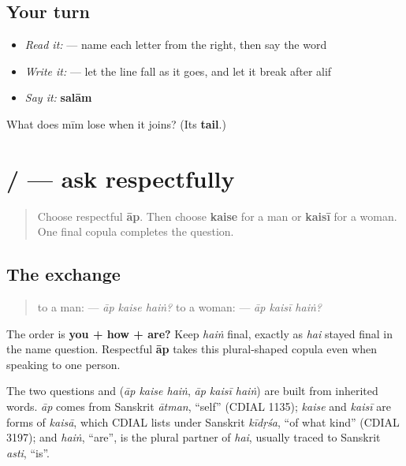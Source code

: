 \subsection*{Your turn}
\begin{itemize}
\raggedright
  \item \emph{Read it:}  — name each letter from the right, then say the word
  \item \emph{Write it:}  — let the line fall as it goes, and let it break after alif
  \item \emph{Say it:} \textbf{salām}
\end{itemize}

\begin{tcolorbox}[breakable,colback=teal!4,colframe=teal!35!black,title={Before you move on}]
What does mīm lose when it joins? (Its \textbf{tail}.)
\end{tcolorbox}
\section[\texorpdfstring{\ur{آپ} \ur{کیسے} \ur{ہیں؟} … (āp kaise haiṅ? …)}{آپ کیسے ہیں؟ … (āp kaise haiṅ? …)}]{   /    — ask respectfully}

\label{lesson:UR-C04-aap-kaise-hain}



\begin{quote}
Choose respectful \textbf{āp}. Then choose \textbf{kaise} for a man or \textbf{kaisī} for a woman. One final copula completes the question.
\end{quote}

\subsection*{The exchange}
\begin{quote}
to a man: \textbf{  } — \emph{āp kaise haiṅ?} to a woman: \textbf{  } — \emph{āp kaisī haiṅ?}
\end{quote}

The order is \textbf{you + how + are?} Keep \textbf{} \emph{haiṅ} final, exactly as \textbf{} \emph{hai} stayed final in the name question. Respectful \textbf{āp} takes this plural-shaped copula even when speaking to one person.

\begin{cousinweb}
The two questions \textbf{  } and \textbf{  } (\emph{āp kaise haiṅ}, \emph{āp kaisī haiṅ}) are built from inherited words. \emph{āp} comes from Sanskrit \emph{ātman}, \textquotedblleft{}self\textquotedblright{} (CDIAL 1135); \emph{kaise} and \emph{kaisī} are forms of \emph{kaisā}, which CDIAL lists under Sanskrit \emph{kīdṛśa}, \textquotedblleft{}of what kind\textquotedblright{} (CDIAL 3197); and \emph{haiṅ}, \textquotedblleft{}are\textquotedblright{}, is the plural partner of \emph{hai}, usually traced to Sanskrit \emph{asti}, \textquotedblleft{}is\textquotedblright{}.
\end{cousinweb}

